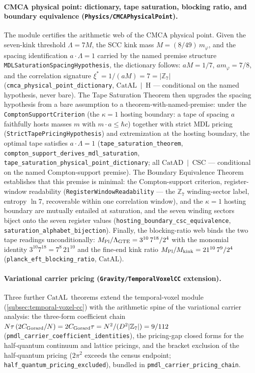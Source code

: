 \documentclass[11pt,a4paper]{article}
\theoremstyle{definition}
\newcommand{\CatAL}{\ensuremath{\mathrm{CatAL}}}
\newcommand{\CatAD}{\ensuremath{\mathrm{CatAD}}}
\begin{document}
\paragraph{CMCA physical point: dictionary, tape saturation, blocking ratio,
  and boundary equivalence (\texttt{Physics/\allowbreak CMCAPhysicalPoint}).}
The module certifies the arithmetic web of the CMCA physical point.
Given the seven-kink threshold $\Lambda = 7M$, the SCC kink mass
$M = (8/49)\,m_\varphi$, and the spacing identification $a\cdot\Lambda = 1$
carried by the named premise structure
\texttt{MDLSaturationSpacingHypothesis}, the dictionary follows:
$aM = 1/7$, $a m_\varphi = 7/8$, and the correlation signature
$\xi^* = 1/(aM) = 7 = |\mathbb{Z}_7|$
(\texttt{cmca\_physical\_point\_dictionary}, \CatAL~$|$~H --- conditional on
the named hypothesis, never bare).
The Tape Saturation Theorem then upgrades the spacing hypothesis from a bare
assumption to a theorem-with-named-premise: under the
\texttt{ComptonSupportCriterion} (the $\kappa = 1$ hosting boundary: a tape
of spacing $a$ faithfully hosts masses $m$ with $m\cdot a \le \hbar c$)
together with strict MDL pricing
(\texttt{StrictTapePricingHypothesis}) and extremization at the hosting
boundary, the optimal tape satisfies $a\cdot\Lambda = 1$
(\texttt{tape\_saturation\_theorem},
 \texttt{compton\_support\_derives\_mdl\_saturation},
 \texttt{tape\_saturation\_physical\_point\_dictionary}; all
\CatAD~$|$~CSC --- conditional on the named Compton-support premise).
The Boundary Equivalence Theorem establishes that this premise is minimal:
the Compton-support criterion, register-window readability
(\texttt{RegisterWindowReadability} --- the $\mathbb{Z}_7$ winding-sector
label, entropy $\ln 7$, recoverable within one correlation window), and the
$\kappa = 1$ hosting boundary are mutually entailed at saturation, and the
seven winding sectors biject onto the seven register values
(\texttt{hosting\_boundary\_csc\_equivalence},
 \texttt{saturation\_alphabet\_bijection}).
Finally, the blocking-ratio web binds the two tape readings unconditionally:
$M_{\rm Pl}/\Lambda_{\rm GTE} = 3^{10}\,7^{18}/2^4$ with the monomial
identity $3^{10}7^{18} = 7^8\,21^{10}$ and the fine-end kink ratio
$M_{\rm Pl}/M_{\rm kink} = 21^{10}\,7^9/2^4$
(\texttt{planck\_eft\_blocking\_ratio}, \CatAL).

\paragraph{Variational carrier pricing
  (\texttt{Gravity/\allowbreak TemporalVoxelCC} extension).}
Three further \CatAL\ theorems extend the temporal-voxel module
(\cref{subsec:temporal-voxel-cc}) with the arithmetic spine of the
variational carrier analysis: the three-form coefficient chain
$N\tau\,(2C_{\rm Gorard}/N) = 2C_{\rm Gorard}\tau = N^2/(D^2|\mathbb{Z}_7|)
= 9/112$
(\texttt{pmdl\_carrier\_coefficient\_identities}), the pricing-gap closed
forms for the half-quantum continuum and lattice pricings, and the bracket
exclusion of the half-quantum pricing ($2\pi^2$ exceeds the census endpoint;
\texttt{half\_quantum\_pricing\_excluded}), bundled in
\texttt{pmdl\_carrier\_pricing\_chain}.
\end{document}
